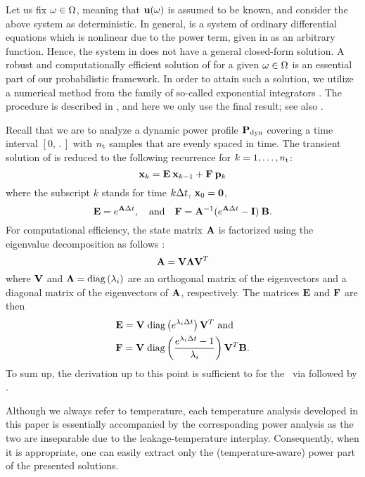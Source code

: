 Let us fix $\omega \in \Omega$, meaning that $\mathbf{u}(\omega)$ is assumed to be known, and consider the above system as deterministic.
In general,  is a system of ordinary differential equations which is nonlinear due to the power term, given in  as an arbitrary function.
Hence, the system in  does not have a general closed-form solution.
A robust and computationally efficient solution of  for a given $\omega \in \Omega$ is an essential part of our probabilistic framework.
In order to attain such a solution, we utilize a numerical method from the family of so-called exponential integrators \cite{hochbruck2010}.
The procedure is described in , and here we only use the final result; see also \cite{ukhov2012}.

Recall that we are to analyze a dynamic power profile $\mathbf{P}_{\text{dyn}}$ covering a time interval $[0, \period]$ with ${n_\text{t}}$ samples that are evenly spaced in time.
The transient solution of  is reduced to the following recurrence for $k = 1, \dots, {n_\text{t}}$:
\begin{equation} \elab{recurrence}
  \vX_k = \mE \: \vX_{k - 1} + \mF \: \vP_k
\end{equation}
where the subscript $k$ stands for time $k \Delta t$, $\mathbf{x}_0 = \mathbf{0}$,
\[
  \mathbf{E} = e^{\mathbf{A} \Delta t}, \hspace{1em} \text{and} \hspace{1em} \mathbf{F} = \mathbf{A}^{-1} (e^{\mathbf{A} \Delta t} - \mathbf{I}) \: \mathbf{B}.
\]
For computational efficiency, the state matrix $\mathbf{A}$ is factorized using the eigenvalue decomposition as follows \cite{press2007}:
\begin{equation} \elab{eigenvalue-decomposition}
  \mA = \mV \mL \mV^T
\end{equation}
where $\mathbf{V}$ and $\mathbf{\Lambda} = \text{diag}\left( \lambda_i \right)$ are an orthogonal matrix of the eigenvectors and a diagonal matrix of the eigenvectors of $\mathbf{A}$, respectively.
The matrices $\mathbf{E}$ and $\mathbf{F}$ are then
\begin{align*}
  & \mathbf{E} = \mathbf{V} \; \text{diag}\left( e^{\lambda_i \Delta t} \right) \mathbf{V}^T \text{ and} \\
  & \mathbf{F} = \mathbf{V} \; \text{diag}\left(  \frac{e^{\lambda_i \Delta t} - 1}{\lambda_i}  \right) \mathbf{V}^T \mathbf{B}.
\end{align*}
To sum up, the derivation up to this point is sufficient to for the \tta\ via  followed by .
\begin{remark}
Although we always refer to temperature, each temperature analysis developed in this paper is essentially accompanied by the corresponding power analysis as the two are inseparable due to the leakage-temperature interplay.
Consequently, when it is appropriate, one can easily extract only the (temperature-aware) power part of the presented solutions.
\end{remark}

